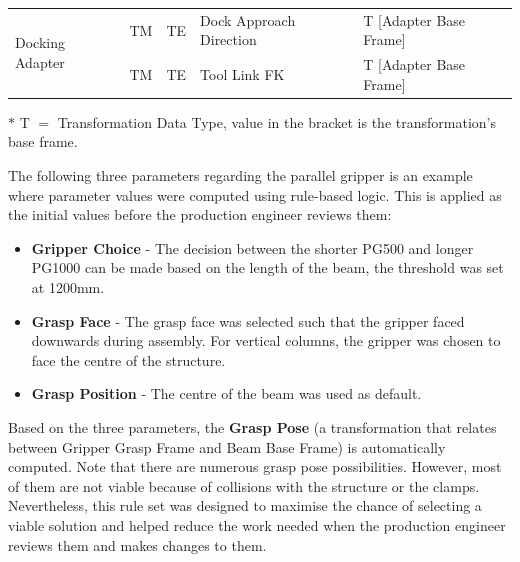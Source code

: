 \documentclass[11pt]{book}
\begin{document}
\begin{table}[H]
\begin{adjustbox}{max width=\textwidth}
\begin{tabular}{p{2.09cm}p{1.51cm}p{1.93cm}p{5.92cm}p{4.48cm}}
\hline
\multicolumn{1}{|p{2.09cm}}{\multirow{2}{*}{\parbox{2.09cm}{{\footnotesize Docking Adapter}}}} & 
\multicolumn{1}{|p{1.51cm}}{{\footnotesize TM}} & 
\multicolumn{1}{|p{1.93cm}}{{\footnotesize TE}} & 
\multicolumn{1}{|p{5.92cm}}{{\footnotesize Dock Approach Direction}} & 
\multicolumn{1}{|p{4.48cm}|}{{\footnotesize T [Adapter Base Frame]}} \\ 
\hhline{~----}
\multicolumn{1}{|p{2.09cm}}{} & 
\multicolumn{1}{|p{1.51cm}}{{\footnotesize TM}} & 
\multicolumn{1}{|p{1.93cm}}{{\footnotesize TE}} & 
\multicolumn{1}{|p{5.92cm}}{{\footnotesize Tool Link FK }} & 
\multicolumn{1}{|p{4.48cm}|}{{\footnotesize T [Adapter Base Frame]}} \\ 
\hline
\end{tabular}
\end{adjustbox}
\end{table}
\vspace{24\baselineskip}
{\scriptsize $\ast$ T $=$ Transformation Data Type, value in the bracket is the transformation’s base frame.}

The following three parameters regarding the parallel gripper is an example where parameter values were computed using rule-based logic. This is applied as the initial values before the production engineer reviews them:

\begin{itemize}
	\item \textbf{Gripper Choice }- The decision between the shorter PG500 and longer PG1000 can be made based on the length of the beam, the threshold was set at 1200mm.

	\item \textbf{Grasp Face} - The grasp face was selected such that the gripper faced downwards during assembly. For vertical columns, the gripper was chosen to face the centre of the structure.

	\item \textbf{Grasp Position} - The centre of the beam was used as default. 

\end{itemize}
Based on the three parameters, the \textbf{Grasp Pose} (a transformation that relates between Gripper Grasp Frame and Beam Base Frame) is automatically computed. Note that there are numerous grasp pose possibilities. However, most of them are not viable because of collisions with the structure or the clamps. Nevertheless, this rule set was designed to maximise the chance of selecting a viable solution and helped reduce the work needed when the production engineer reviews them and makes changes to them. 
\end{document}
